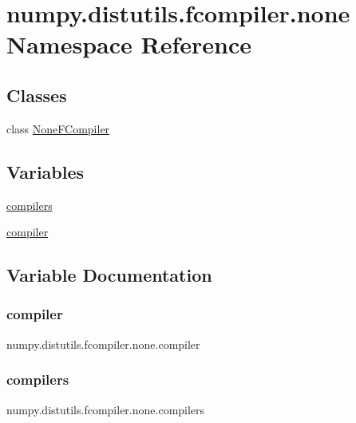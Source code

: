 \hypertarget{namespacenumpy_1_1distutils_1_1fcompiler_1_1none}{}\section{numpy.\+distutils.\+fcompiler.\+none Namespace Reference}
\label{namespacenumpy_1_1distutils_1_1fcompiler_1_1none}
\subsection*{Classes}
\begin{DoxyCompactItemize}
\item 
class \hyperlink{classnumpy_1_1distutils_1_1fcompiler_1_1none_1_1NoneFCompiler}{None\+F\+Compiler}
\end{DoxyCompactItemize}
\subsection*{Variables}
\begin{DoxyCompactItemize}
\item 
\hyperlink{namespacenumpy_1_1distutils_1_1fcompiler_1_1none_a9361673befb44a399c031cc2e788f8fa}{compilers}
\item 
\hyperlink{namespacenumpy_1_1distutils_1_1fcompiler_1_1none_afd892bda609907127efab18cb64e8d76}{compiler}
\end{DoxyCompactItemize}


\subsection{Variable Documentation}
\mbox{\label{namespacenumpy_1_1distutils_1_1fcompiler_1_1none_afd892bda609907127efab18cb64e8d76}} 
\subsubsection{\texorpdfstring{compiler}{compiler}}
{\footnotesize\ttfamily numpy.\+distutils.\+fcompiler.\+none.\+compiler}

\mbox{\label{namespacenumpy_1_1distutils_1_1fcompiler_1_1none_a9361673befb44a399c031cc2e788f8fa}} 
\subsubsection{\texorpdfstring{compilers}{compilers}}
{\footnotesize\ttfamily numpy.\+distutils.\+fcompiler.\+none.\+compilers}

